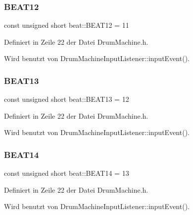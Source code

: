\mbox{\label{namespacebeat_ae84780c2b37cac562b4f9e7676d7a715}} 
\subsubsection{\texorpdfstring{B\+E\+A\+T12}{BEAT12}}
{\footnotesize\ttfamily const unsigned short beat\+::\+B\+E\+A\+T12 = 11}



Definiert in Zeile 22 der Datei Drum\+Machine.\+h.



Wird benutzt von Drum\+Machine\+Input\+Listener\+::input\+Event().

\mbox{\label{namespacebeat_a0056cac49aa9cd40c0532068b40322fe}} 
\subsubsection{\texorpdfstring{B\+E\+A\+T13}{BEAT13}}
{\footnotesize\ttfamily const unsigned short beat\+::\+B\+E\+A\+T13 = 12}



Definiert in Zeile 22 der Datei Drum\+Machine.\+h.



Wird benutzt von Drum\+Machine\+Input\+Listener\+::input\+Event().

\mbox{\label{namespacebeat_aa25c9d3e796af023ea86fc1181ff4732}} 
\subsubsection{\texorpdfstring{B\+E\+A\+T14}{BEAT14}}
{\footnotesize\ttfamily const unsigned short beat\+::\+B\+E\+A\+T14 = 13}



Definiert in Zeile 22 der Datei Drum\+Machine.\+h.



Wird benutzt von Drum\+Machine\+Input\+Listener\+::input\+Event().

\mbox{\label{namespacebeat_a241a13409659dff75e5368358447fc73}} 
